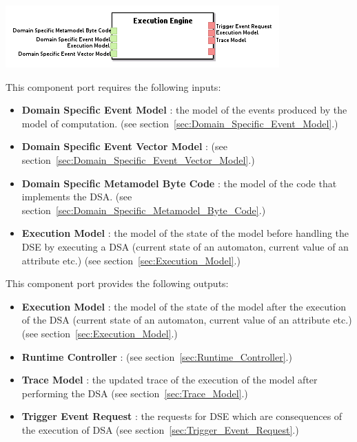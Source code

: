\documentclass{gemoc} %
\begin{document}
\begin{center}
\includegraphics*[trim=0.0cm 0.0cm 0cm 0.0cm, clip=true]{../images/generated/Generated_Execution_Engine.png}
\end{center}

This component port requires the following inputs:
\begin{itemize}
  \item \textbf{Domain Specific Event Model} :
the model of the events produced by the model of computation.
(see section~\ref{sec:Domain_Specific_Event_Model}.)
  \item \textbf{Domain Specific Event Vector Model} :
(see section~\ref{sec:Domain_Specific_Event_Vector_Model}.)
  \item \textbf{Domain Specific Metamodel Byte Code} :
the model of the code that implements the DSA.
(see section~\ref{sec:Domain_Specific_Metamodel_Byte_Code}.)
  \item \textbf{Execution Model} :
the model of the state of the model before handling the DSE by executing a DSA (current state of an automaton, current value of an attribute etc.)
(see section~\ref{sec:Execution_Model}.)
\end{itemize}

This component port provides the following outputs:
\begin{itemize}
  \item \textbf{Execution Model} :
the model of the state of the model after the execution of the DSA (current state of an automaton, current value of an attribute etc.)
(see section~\ref{sec:Execution_Model}.)
  \item \textbf{Runtime Controller} :
(see section~\ref{sec:Runtime_Controller}.)
  \item \textbf{Trace Model} :
the updated trace of the execution of the model after performing the DSA
(see section~\ref{sec:Trace_Model}.)
  \item \textbf{Trigger Event Request} :
the requests for DSE which are consequences of the execution of DSA
(see section~\ref{sec:Trigger_Event_Request}.)
\end{itemize}
\end{document}
